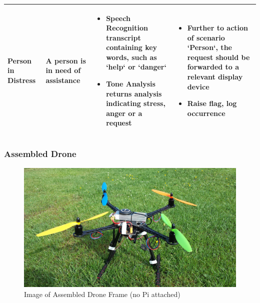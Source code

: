 \documentclass{article}
\begin{document}
\begin{table}[H]
\begin{tabularx}{\textwidth}{| >{\centering}m{1.5cm} | >{\centering}m{2cm} | X | X |}
    Person in Distress & \vspace{\baselineskip} A person is in need of assistance &
    \begin{itemize} [topsep=0pt, leftmargin=0cm,itemindent=.5cm,labelwidth=\itemindent,labelsep=0cm,align=left]
        \item Speech Recognition transcript containing key words, such as `help` or `danger`
        \item Tone Analysis returns analysis indicating stress, anger or a request
    \end{itemize} &
    \begin{itemize} [topsep=0pt, leftmargin=0cm,itemindent=.5cm,labelwidth=\itemindent,labelsep=0cm,align=left]
        \item Further to action of scenario `Person`, the request should be forwarded to a relevant display device
        \item Raise flag, log occurrence
    \end{itemize} \\ \hline


\end{tabularx}
\end{table}

\subsubsection{Assembled Drone}
\begin{figure}[H]
\centering
\caption{Image of Assembled Drone Frame (no Pi attached)\label{AssembledDrone}}
\includegraphics[width=\textwidth]{Drone}
\end{figure}
\end{document}
